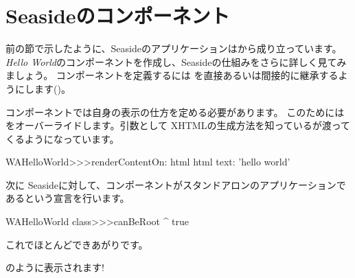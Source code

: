 \documentclass[a4paper,10pt,twoside]{book}
\begin{document}
\section{Seasideのコンポーネント}


前の節で示したように、Seasideのアプリケーションは\emph{}から成り立っています。
\emph{Hello World}のコンポーネントを作成し、Seasideの仕組みをさらに詳しく見てみましょう。
コンポーネントを定義するには を直接あるいは間接的に継承するようにします()。


コンポーネントでは自身の表示の仕方を定める必要があります。
このためにはをオーバーライドします。引数として XHTMLの生成方法を知っているが渡ってくるようになっています。

\begin{code}{}
WAHelloWorld>>>renderContentOn: html
	html text: 'hello world'
\end{code}

\noindent
次に Seasideに対して、コンポーネントがスタンドアロンのアプリケーションであるという宣言を行います。


\begin{code}{}
WAHelloWorld class>>>canBeRoot
	^ true
\end{code}

\noindent
これでほとんどできあがりです。

のように表示されます!
\end{document}
